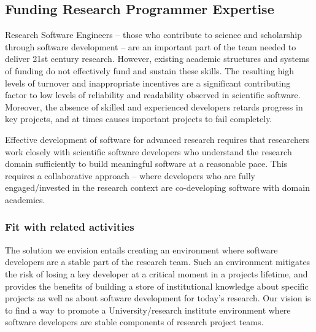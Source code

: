 \subsection{Funding Research Programmer Expertise}
\label{RSE}



Research Software Engineers -- those who contribute to science and scholarship
through software development -- are an important part of the team
needed to deliver 21st century research. However, existing academic structures
and systems of funding do not effectively fund and sustain these skills.
The resulting high levels of turnover and inappropriate incentives
are a significant contributing factor to low levels of reliability and
readability observed in scientific software. Moreover, the absence of skilled and experienced 
developers retards progress in key projects, and at times causes important projects to fail completely.

Effective development of software for advanced research requires
that researchers work closely with scientific software developers who understand
the research domain sufficiently to build meaningful software at a reasonable pace. 
This requires a collaborative approach -- where developers who are fully engaged/invested 
in the research context are co-developing software with domain academics.

\subsubsection{Fit with related activities}

The solution we envision entails creating an environment where software developers 
are a stable part of the research team. Such an environment mitigates the risk
of losing a key developer at a critical moment in a projects lifetime, and provides
the benefits of building a store of institutional knowledge about specific projects as well as about software 
development for today's research. Our vision is to find a way to promote a University/research institute environment where
software developers are stable components of research project teams. 

